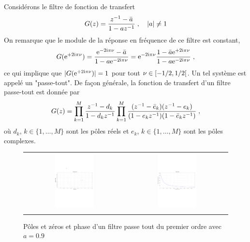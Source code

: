 \begin{example}
Considérons le filtre de fonction de transfert
\[
G(z)= \frac{z^{-1} - \bar{a}}{1-a z^{-1}} \;, \quad |a| \ne 1
\]
On remarque que le module de la réponse en fréquence de ce filtre est constant, \ie\ 
\[
G(\mathrm{e}^{+2 \mathrm{i} \pi \nu})= \frac{\mathrm{e}^{-2 \mathrm{i} \pi \nu} - \bar{a}}{1 - a \mathrm{e}^{-2 \mathrm{i} \pi \nu}}= \mathrm{e}^{-2 \mathrm{i} \pi \nu} \frac{1 - \bar{a} \mathrm{e}^{+2 \mathrm{i} \pi \nu}}{1 - a \mathrm{e}^{-2 \mathrm{i} \pi \nu}} \;,
\]
ce qui implique que $|G(\mathrm{e}^{+2 \mathrm{i} \pi \nu})|= 1$ pour tout $\nu \in \left[-1/2,1/2\right[$. Un tel système est appelé un "passe-tout". De façon générale, la fonction de transfert d'un filtre passe-tout est donnée par
\[
G(z)= \prod_{k=1}^M \frac{z^{-1} - d_k}{1 - d_k z^{-1}} \prod_{k=1}^M \frac{(z^{-1} - \bar{e}_k)(z^{-1}-e_k)}{(1-e_k z^{-1})(1-\bar{e}_k z^{-1})} \;, 
\]
où $d_k$, $k \in \{1,\dots,M\}$ sont les pôles réels et $e_k$, $k \in \{1,\dots,M\}$ sont les pôles complexes.
 
\begin{figure}
  \centering
  \begin{tabular}{cc}
  \includegraphics[width=0.4\textwidth]{Figures/polezero}& \includegraphics[width=0.4\textwidth]{Figures/phasedelay1}\\
  \caption{Pôles et zéros et phase d'un filtre passe tout du premier ordre avec $a=0.9$}\label{fig:passetout-1}
  \end{tabular}
\end{figure}


\end{example}

\begin{example}

\end{example}